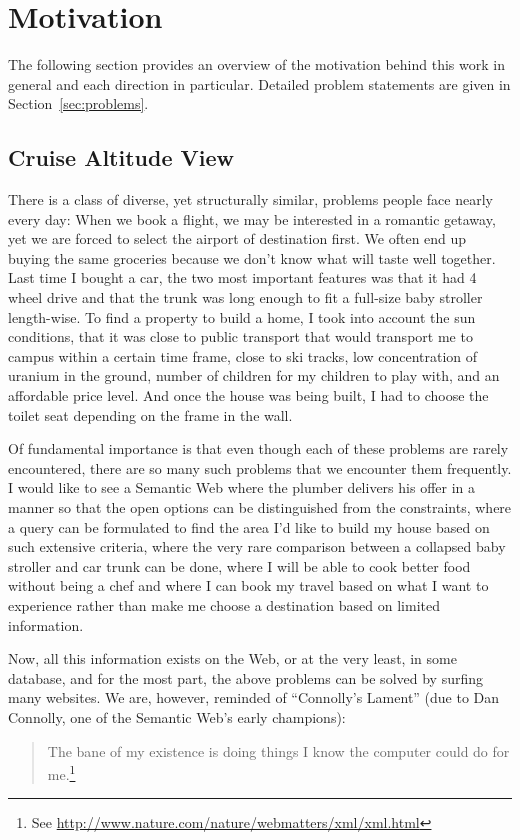 \section{Motivation}\label{sec:motivation}

The following section provides an overview of the motivation behind
this work in general and each direction in particular. Detailed
problem statements are given in Section~\ref{sec:problems}.

\subsection{Cruise Altitude View}

There is a class of diverse, yet structurally similar, problems people
face nearly every day: When we book a flight, we may be interested in
a romantic getaway, yet we are forced to select the airport of
destination first. We often end up buying the same groceries because
we don't know what will taste well together. Last time I bought a car,
the two most important features was that it had 4 wheel drive and that
the trunk was long enough to fit a full-size baby stroller
length-wise. To find a property to build a home, I took into account
the sun conditions, that it was close to public transport that would
transport me to campus within a certain time frame, close to
ski tracks, low concentration of uranium in the ground, number of children for
my children to play with, and an affordable price level. And once the
house was being built, I had to choose the toilet seat depending on
the frame in the wall.

Of fundamental importance is that even though each of these
problems are rarely encountered, there are so many such problems that
we encounter them frequently. I would like to see a Semantic Web
where the plumber delivers his offer in a manner so that the open
options can be distinguished from the constraints, where a query can
be formulated to find the area I'd like to build my house based on
such extensive criteria, where the very rare comparison between a
collapsed baby stroller and car trunk can be done, where I will be
able to cook better food without being a chef and where I can book my
travel based on what I want to experience rather than make me choose a
destination based on limited information.

Now, all this information exists on the Web, or at the very least, in
some database, and for the most part, the above problems can be
solved by surfing many websites. We are, however, reminded of ``Connolly's
Lament'' (due to Dan Connolly, one of the Semantic Web's early champions):
\begin{quote}
 The bane of my existence is doing things I know the computer could do
 for me.\footnote{See \url{http://www.nature.com/nature/webmatters/xml/xml.html}}
\end{quote}

